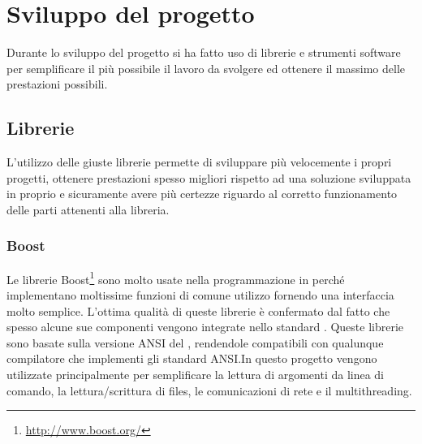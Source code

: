 \chapter{Sviluppo del progetto}
\label{sw_devel}

Durante lo sviluppo del progetto si ha fatto uso di librerie e strumenti
software per semplificare il pi\`u possibile il lavoro da svolgere ed ottenere
il massimo delle prestazioni possibili. 

\section{Librerie}
L'utilizzo delle giuste librerie permette di sviluppare pi\`u velocemente i
propri progetti, ottenere prestazioni spesso migliori rispetto ad una soluzione
sviluppata in proprio e sicuramente avere pi\`u certezze riguardo al corretto
funzionamento delle parti attenenti alla libreria.

\subsection{Boost}
Le librerie Boost\footnote{\url{http://www.boost.org/}} sono molto usate nella
programmazione in \CC perch\'e implementano moltissime funzioni di comune
utilizzo fornendo una interfaccia molto semplice. L'ottima qualit\`a di queste
librerie \`e confermato dal fatto che spesso alcune sue componenti vengono
integrate nello standard \CC. Queste librerie sono basate sulla versione ANSI
del \CC, rendendole compatibili con qualunque compilatore che implementi gli
standard ANSI.In questo progetto vengono utilizzate principalmente per
semplificare la lettura di argomenti da linea di comando, la lettura/scrittura
di files, le comunicazioni di rete e il multithreading.


